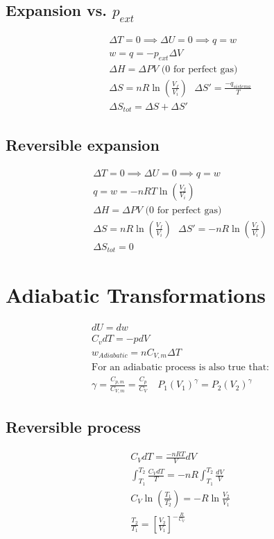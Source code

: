 \documentclass[a4paper]{report}
\begin{document}
\begin{multicols}{2}
        \subsection{Expansion vs. $p_{ext}$}
          \begin{gather*}
            \Delta T = 0 \implies \Delta U = 0 \implies q = w\\
            w = q = -p_{ext} \Delta V \\
            \Delta H = \Delta PV \text{ (0 for perfect gas)}\\
            \Delta S = nR\ln (\frac{V_f}{V_i}) ~ ~ ~\Delta S' = \frac{-q_{sistema}}{T}\\
            \Delta S_{tot} = \Delta S + \Delta S'
          \end{gather*}

        \subsection{Reversible expansion}
          \begin{gather*}
            \Delta T = 0 \implies \Delta U = 0 \implies q = w\\
            q = w = -nRT\ln (\frac{V_f}{V_i})\\
            \Delta H = \Delta PV\text{ (0 for perfect gas)}\\
            \Delta S = nR \ln (\frac{V_f}{V_i}) ~ ~ ~\Delta S' = - nR\ln (\frac{V_f}{V_i})\\
            \Delta S_{tot} = 0
          \end{gather*}

      \section{Adiabatic Transformations}

          \begin{gather*}
            dU = dw \\
            C_{v}dT = -pdV \\
            w_{Adiabatic} = nC_{V,m}\Delta T\\
            \text{For an adiabatic process is also true that:} \\
              \gamma = \frac{C_{p,m} }{C_{V,m} } = \frac{C_{p}  }{C_{V} } \quad P_1(V_1)^{\gamma} = P_2(V_2 )^{\gamma }  
          \end{gather*}

        \subsection{Reversible process}
        \begin{gather*}
          C_{V}dT = \frac{-nRT}{V}dV\\
          \int _{T_1}^{T_2} \frac{C_{V}dT }{T}  = -nR\int _{T_1}^{T_2}\frac{dV}{V}\\
          C_{V}\ln \left(\frac{T_1}{T_2} \right) = -R\ln \frac{V_2}{V_1} \\
          \frac{T_2}{T_1}=\left [\frac{V_2}{V_1}\right]^{-\frac{R}{C_{V}}}
        \end{gather*}


\end{multicols}
\end{document}

